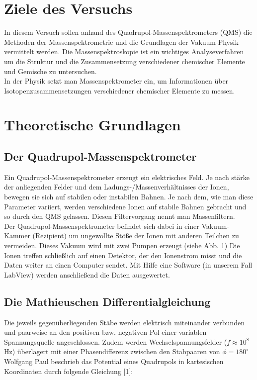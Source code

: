 \section{Ziele des Versuchs}
In diesem Versuch sollen anhand des Quadrupol-Massenspektrometers (QMS) die Methoden der Massenspektrometrie und die Grundlagen der Vakuum-Physik vermittelt werden. Die Massenspektroskopie ist ein wichtiges Analyseverfahren um die Struktur und die Zusammensetzung verschiedener chemischer Elemente und Gemische zu untersuchen.\\
In der Physik setzt man Massenspektrometer ein, um Informationen über Isotopenzusammensetzungen verschiedener chemischer Elemente zu messen.

\section{Theoretische Grundlagen}
\subsection{Der Quadrupol-Massenspektrometer}
Ein Quadrupol-Massenspektrometer erzeugt ein elektrisches Feld. Je nach stärke der anliegenden Felder und dem Ladungs-/Massenverhältnisses der Ionen, bewegen sie sich auf stabilen oder instabilen Bahnen. Je nach dem, wie man diese Parameter variiert, werden verschiedene Ionen auf stabile Bahnen gebracht und so durch den QMS gelassen. Diesen Filtervorgang nennt man Massenfiltern.\\
Der Quadrupol-Massenspektrometer befindet sich dabei in einer Vakuum-Kammer (Rezipient) um ungewollte Stöße der Ionen mit anderen Teilchen zu vermeiden. Dieses Vakuum wird mit zwei Pumpen erzeugt (siehe Abb. 1) Die Ionen treffen schließlich auf einen Detektor, der den Ionenstrom misst und die Daten weiter an einen Computer sendet. Mit Hilfe eine Software (in unserem Fall LabView) werden anschließend die Daten ausgewertet.


\newpage
\subsection{Die Mathieuschen Differentialgleichung}
Die jeweils gegenüberliegenden Stäbe werden elektrisch miteinander verbunden und paarweise an den positiven bzw. negativen Pol einer variablen Spannungsquelle angeschlossen. Zudem werden Wechselspannungsfelder ($f \approx 10^8$ Hz) überlagert mit einer Phasendifferenz zwischen den Stabpaaren von $\phi = 180^{\circ}$\\
Wolfgang Paul beschrieb das Potential eines Quadrupols in kartesischen Koordinaten durch folgende Gleichung [1]:

